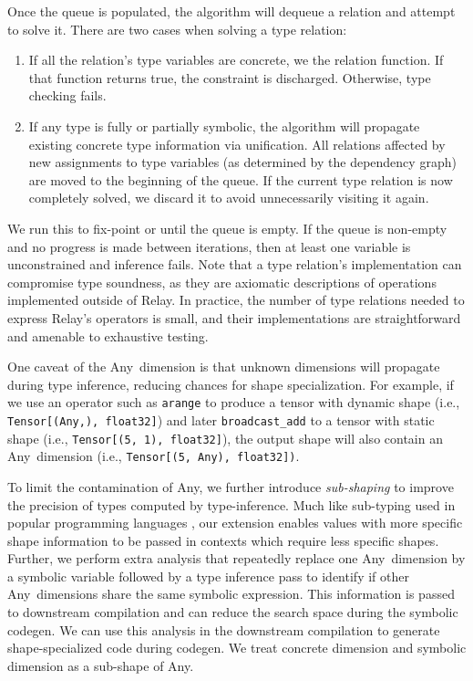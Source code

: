 Once the queue is populated, the algorithm will dequeue a relation and attempt to solve it.
There are two cases when solving a type relation:
\begin{enumerate}
  \item If all the relation's type variables
  are concrete, we the relation function. If that function returns true, the
  constraint is discharged. Otherwise, type checking fails.
  \item If any type is fully or partially symbolic, the
    algorithm will propagate
    existing concrete type information via unification.
  All relations affected by new assignments to type
    variables (as determined by the dependency graph)
    are moved to the beginning of the queue.
  If the current type relation is now completely solved, we
  discard it to avoid unnecessarily visiting it again.
\end{enumerate}

We run this to fix-point or until the queue is empty.
If the queue is non-empty and no progress is made between iterations,
  then at least one variable is unconstrained and inference fails.
Note that a type relation's implementation can
  compromise type soundness, as they are axiomatic descriptions
  of operations implemented outside of Relay.
In practice, the number of type relations needed to express Relay's
  operators is small, and their implementations are straightforward
  and amenable to exhaustive testing.

One caveat of the Any~dimension is that unknown dimensions will
  propagate during type inference, reducing chances for shape specialization.
For example, if we use an operator such as {\tt arange} to produce a
  tensor with dynamic shape (i.e., \texttt{Tensor[(Any,), float32]})
  and later {\tt broadcast\_add} to a tensor with static shape (i.e., \texttt{Tensor[(5, 1), float32]}),
  the output shape will also contain an Any~dimension (i.e., \texttt{Tensor[(5, Any), float32])}.

To limit the contamination of Any, we further introduce {\em sub-shaping}
  to improve the precision of types computed by type-inference.
Much like sub-typing used in popular programming languages \citep{LiskovTPLS1994,AmadioAmadioTPLS1993},
  our extension enables values with more specific shape information to be passed in contexts which require less specific shapes.
Further, we perform extra analysis that repeatedly replace one Any~dimension by a symbolic variable followed by
  a type inference pass to identify if other Any~dimensions share the same symbolic expression.
This information is passed to downstream compilation
  and can reduce the search space during the symbolic codegen.
We can use this analysis in the downstream compilation
  to generate shape-specialized code during codegen.
We treat concrete dimension and symbolic dimension as a sub-shape of Any.



